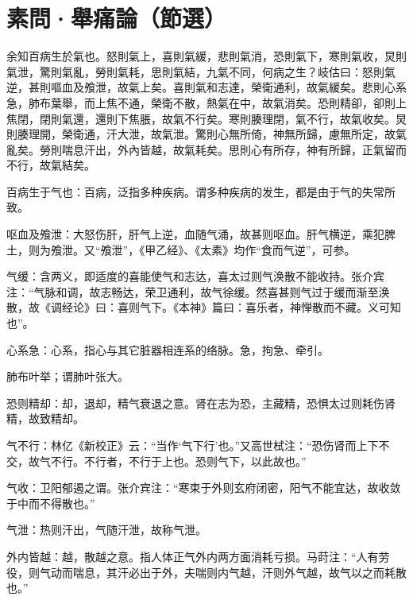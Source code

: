 \documentclass[draft,12pt]{ctexbook}
\begin{document}

\section{素問·舉痛論（節選）}%


\begin{yuanwen}
余知百病生於氣也。怒則氣上，喜則氣緩，悲則氣消，恐則氣下，寒則氣收，炅則氣泄，驚則氣亂，勞則氣耗，思則氣結，九氣不同，何病之生？岐估曰：怒則氣逆，甚則嘔血及飧泄，故氣上矣。喜則氣和志達，榮衛通利，故氣緩矣。悲則心系急，肺布葉舉，而上焦不通，榮衛不散，熱氣在中，故氣消矣。恐則精卻，卻則上焦閉，閉則氣還，還則下焦脹，故氣不行矣。寒則腠理閉，氣不行，故氣收矣。炅則腠理開，榮衛通，汗大泄，故氣泄。驚則心無所倚，神無所歸，慮無所定，故氣亂矣。勞則喘息汗出，外內皆越，故氣耗矣。思則心有所存，神有所歸，正氣留而不行，故氣結矣。
\end{yuanwen}


\begin{jiaozhu}
  \item 百病生于气也：百病，泛指多种疾病。谓多种疾病的发生，都是由于气的失常所致。
  \item 呕血及飧泄：大怒伤肝，肝气上逆，血随气涌，故甚则呕血。肝气横逆，乘犯脾土，则为飧泄。又“飧泄”，《甲乙经》、《太素》均作“食而气逆”，可参。
  \item 气缓：含两义，即适度的喜能使气和志达，喜太过则气涣散不能收持。张介宾注：“气脉和调，故志畅达，荣卫通利，故气徐缓。然喜甚则气过于缓而渐至涣散，故《调经论》曰：喜则气下。《本神》篇曰：喜乐者，神惮散而不藏。义可知也”。
  \item 心系急：心系，指心与其它脏器相连系的络脉。急，拘急、牵引。
  \item 肺布叶举；谓肺叶张大。
  \item 恐则精却：却，退却，精气衰退之意。肾在志为恐，主藏精，恐惧太过则耗伤肾精，故致精却。
  \item 气不行：林亿《新校正》云：“当作‘气下行’也。”又高世栻注：“恐伤肾而上下不交，故气不行。不行者，不行于上也。恐则气下，以此故也。”
  \item 气收：卫阳郁遏之谓。张介宾注：“寒束于外则玄府闭密，阳气不能宜达，故收敛于中而不得散也。”
  \item 气泄：热则汗出，气随汗泄，故称气泄。
  \item 外内皆越：越，散越之意。指人体正气外内两方面消耗亏损。马莳注：“人有劳役，则气动而喘息，其汗必出于外，夫喘则内气越，汗则外气越，故气以之而耗散也。”
\end{jiaozhu}
\end{document}
